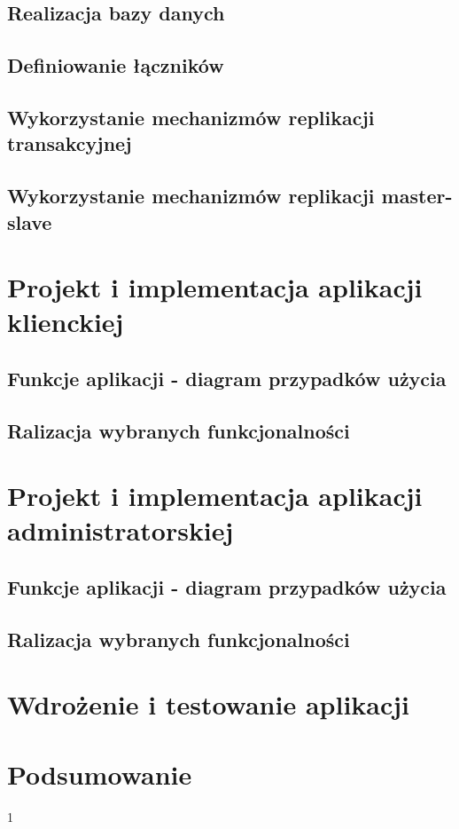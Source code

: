 \documentclass{article}
\begin{document}
	\subsection{Realizacja bazy danych}

	\subsection{Definiowanie łączników}
	
	\subsection{Wykorzystanie mechanizmów replikacji transakcyjnej}

	\subsection{Wykorzystanie mechanizmów replikacji master-slave}
	
\section{Projekt i implementacja aplikacji klienckiej}
	\subsection{Funkcje aplikacji - diagram przypadków użycia}

	\subsection{Ralizacja wybranych funkcjonalności}
	
\section{Projekt i implementacja aplikacji administratorskiej}
	\subsection{Funkcje aplikacji - diagram przypadków użycia}

	\subsection{Ralizacja wybranych funkcjonalności}
	
\section{Wdrożenie i testowanie aplikacji}

\section{Podsumowanie}

 
1
 
\end{document}
